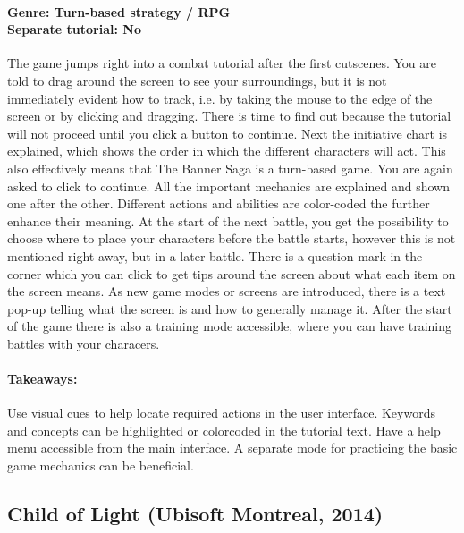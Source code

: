 \paragraph{Genre: Turn-based strategy / RPG \\ Separate tutorial: No \\}
The game jumps right into a combat tutorial after the first cutscenes. You are told to drag around the screen to see your surroundings, but it is not immediately evident how to track, i.e. by taking the mouse to the edge of the screen or by clicking and dragging. There is time to find out because the tutorial will not proceed until you click a button to continue. Next the initiative chart is explained, which shows the order in which the different characters will act. This also effectively means that The Banner Saga is a turn-based game. You are again asked to click to continue. All the important mechanics are explained and shown one after the other. Different actions and abilities are color-coded the further enhance their meaning. At the start of the next battle, you get the possibility to choose where to place your characters before the battle starts, however this is not mentioned right away, but in a later battle. There is a question mark in the corner which you can click to get tips around the screen about what each item on the screen means. As new game modes or screens are introduced, there is a text pop-up telling what the screen is and how to generally manage it. After the start of the game there is also a training mode accessible, where you can have training battles with your characers.
\paragraph{Takeaways:}
Use visual cues to help locate required actions in the user interface. Keywords and concepts can be highlighted or colorcoded in the tutorial text. Have a help menu accessible from the main interface. A separate mode for practicing the basic game mechanics can be beneficial.

\subsection{Child of Light (Ubisoft Montreal, 2014)}
